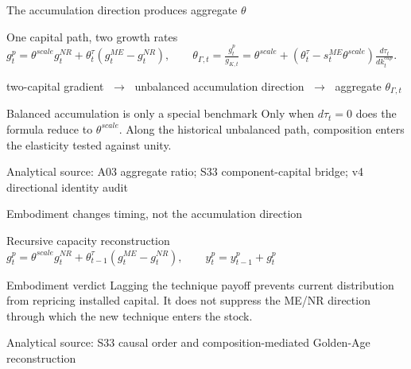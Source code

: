 \documentclass[10pt,aspectratio=169]{beamer}
\newcommand{\LR}{\mathrm{LR}}
\newcommand{\sourcefooter}[1]{%
  \par\vfill{\tiny\color{gray!70}Analytical source: #1}\vspace{-0.35em}}
\begin{document}
\begin{frame}{The accumulation direction produces aggregate $\theta$}
  \small
  \begin{block}{One capital path, two growth rates}
    \centering
    $\displaystyle
    g_t^p
    =\theta^{scale}g_t^{NR}
    +\theta_t^{\tau}(g_t^{ME}-g_t^{NR}),
    \qquad
    \theta_{\Gamma,t}
    =\frac{g_t^p}{g_{K,t}}
    =\theta^{scale}
    +\left(\theta_t^{\tau}-s_t^{ME}\theta^{scale}\right)
      \frac{d\tau_t}{d k_t^{cap}}.$
  \end{block}
  \centering
  two-capital gradient
  $\;\longrightarrow\;$ unbalanced accumulation direction
  $\;\longrightarrow\;$ aggregate $\theta_{\Gamma,t}$
  \begin{alertblock}{Balanced accumulation is only a special benchmark}
    Only when $d\tau_t=0$ does the formula reduce to $\theta^{scale}$. Along the historical unbalanced path, composition enters the elasticity tested against unity.
  \end{alertblock}
  \sourcefooter{A03 aggregate ratio; S33 component-capital bridge; v4 directional identity audit}
\end{frame}

\begin{frame}{Embodiment changes timing, not the accumulation direction}
  \centering

  \vspace{0.8em}
  \begin{block}{Recursive capacity reconstruction}
    \centering
    \Large
    $\displaystyle
    g_t^p
    =\theta^{scale}g_t^{NR}
    +\theta_{t-1}^{\tau}(g_t^{ME}-g_t^{NR}),
    \qquad
    y_t^p=y_{t-1}^p+g_t^p$
  \end{block}
  \begin{alertblock}{Embodiment verdict}
    Lagging the technique payoff prevents current distribution from repricing installed capital. It does not suppress the ME/NR direction through which the new technique enters the stock.
  \end{alertblock}
  \sourcefooter{S33 causal order and composition-mediated Golden-Age reconstruction}
\end{frame}
\end{document}
